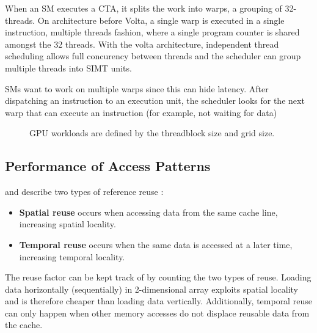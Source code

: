 When an SM executes a CTA, it splits the work into warps, a grouping of 32-threads.
On architecture before Volta, a single warp is executed in a single instruction, multiple threads fashion, where a single program counter is shared amongst the 32 threads.
With the volta architecture, independent thread scheduling allows full concurency between threads and the scheduler can group multiple threads into SIMT units.

SMs want to work on multiple warps since this can hide latency.
After dispatching an instruction to an execution unit, the scheduler looks for the next warp that can execute an instruction (for example, not waiting for data) 

\begin{figure}[!hb]
    \centering
    \caption{
        GPU workloads are defined by the threadblock size and grid size.
    }
\end{figure}

\subsection{Performance of Access Patterns}
\label{sec:access_patterns}
\citeauthor{lam1991cache} and \citeauthor{meyer2003algorithms} describe two types of reference reuse \cite{lam1991cache, meyer2003algorithms}:
\begin{itemize}
    \item \textbf{Spatial reuse} occurs when accessing data from the same cache line, increasing spatial locality.
    \item \textbf{Temporal reuse} occurs when the same data is accessed at a later time, increasing temporal locality.
\end{itemize}
The reuse factor can be kept track of by counting the two types of reuse.
Loading data horizontally (sequentially) in 2-dimensional array exploits spatial locality and is therefore cheaper than loading data vertically.
Additionally, temporal reuse can only happen when other memory accesses do not displace reusable data from the cache.

